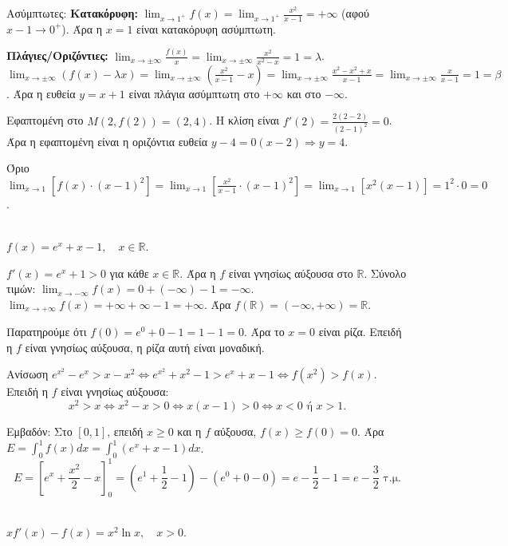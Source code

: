\documentclass[11pt,a4paper,modern,B]{FFExam}
\begin{document}
\begin{thema}
\begin{erwthma}
\item Ασύμπτωτες:
\textbf{Κατακόρυφη:}
$\lim_{x \to 1^+} f(x) = \lim_{x \to 1^+} \frac{x^2}{x-1} = +\infty$ (αφού $x-1 \to 0^+$).
Άρα η $x = 1$ είναι κατακόρυφη ασύμπτωτη.

\textbf{Πλάγιες/Οριζόντιες:}
$\lim_{x \to \pm\infty} \frac{f(x)}{x} = \lim_{x \to \pm\infty} \frac{x^2}{x^2-x} = 1 = \lambda$.
$\lim_{x \to \pm\infty} (f(x) - \lambda x) = \lim_{x \to \pm\infty} (\frac{x^2}{x-1} - x) = \lim_{x \to \pm\infty} \frac{x^2 - x^2 + x}{x-1} = \lim_{x \to \pm\infty} \frac{x}{x-1} = 1 = \beta$.
Άρα η ευθεία $y = x + 1$ είναι πλάγια ασύμπτωτη στο $+\infty$ και στο $-\infty$.

\item Εφαπτομένη στο $M(2, f(2)) = (2, 4)$.
Η κλίση είναι $f'(2) = \frac{2(2-2)}{(2-1)^2} = 0$.
Άρα η εφαπτομένη είναι η οριζόντια ευθεία $y - 4 = 0(x-2) \Rightarrow \boxed{y = 4}$.

\item Όριο $\lim_{x \to 1} [f(x) \cdot (x-1)^2] = \lim_{x \to 1} \left[ \frac{x^2}{x-1} \cdot (x-1)^2 \right] = \lim_{x \to 1} [x^2 (x-1)] = 1^2 \cdot 0 = 0$.
\end{erwthma}
\item\mbox{}\\
$f(x) = e^x + x - 1, \quad x \in \mathbb{R}$.

\begin{erwthma}
\item $f'(x) = e^x + 1 > 0$ για κάθε $x \in \mathbb{R}$.
Άρα η $f$ είναι γνησίως αύξουσα στο $\mathbb{R}$.
Σύνολο τιμών:
$\lim_{x \to -\infty} f(x) = 0 + (-\infty) - 1 = -\infty$.
$\lim_{x \to +\infty} f(x) = +\infty + \infty - 1 = +\infty$.
Άρα $f(\mathbb{R}) = (-\infty, +\infty) = \mathbb{R}$.

\item Παρατηρούμε ότι $f(0) = e^0 + 0 - 1 = 1 - 1 = 0$.
Άρα το $x=0$ είναι ρίζα.
Επειδή η $f$ είναι γνησίως αύξουσα, η ρίζα αυτή είναι μοναδική.

\item Ανίσωση $e^{x^2} - e^x > x - x^2 \Leftrightarrow e^{x^2} + x^2 - 1 > e^x + x - 1 \Leftrightarrow f(x^2) > f(x)$.
Επειδή η $f$ είναι γνησίως αύξουσα:
$$ x^2 > x \Leftrightarrow x^2 - x > 0 \Leftrightarrow x(x-1) > 0 \Leftrightarrow x < 0 \text{ ή } x > 1. $$

\item Εμβαδόν:
Στο $[0, 1]$, επειδή $x \geq 0$ και η $f$ αύξουσα, $f(x) \geq f(0) = 0$.
Άρα $E = \int_0^1 f(x) dx = \int_0^1 (e^x + x - 1) dx$.
$$ E = [e^x + \frac{x^2}{2} - x]_0^1 = (e^1 + \frac{1}{2} - 1) - (e^0 + 0 - 0) = e - \frac{1}{2} - 1 = e - \frac{3}{2} \text{ τ.μ.} $$
\end{erwthma}
\item\mbox{}\\
$x f'(x) - f(x) = x^2 \ln x, \quad x > 0$.


\end{thema}
\end{document}
